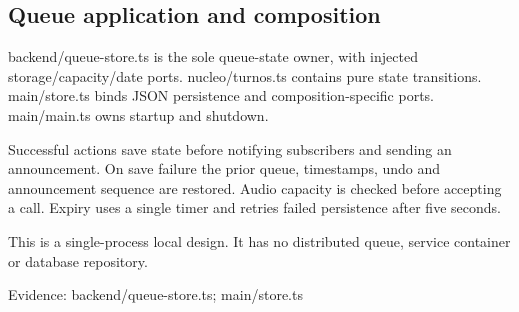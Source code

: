 \subsection{Queue application and composition}

backend/queue-store.ts is the sole queue-state owner, with injected storage/capacity/date ports. nucleo/turnos.ts contains pure state transitions. main/store.ts binds JSON persistence and composition-specific ports. main/main.ts owns startup and shutdown.

Successful actions save state before notifying subscribers and sending an announcement. On save failure the prior queue, timestamps, undo and announcement sequence are restored. Audio capacity is checked before accepting a call. Expiry uses a single timer and retries failed persistence after five seconds.

This is a single-process local design. It has no distributed queue, service container or database repository.

Evidence: backend/queue-store.ts; main/store.ts
